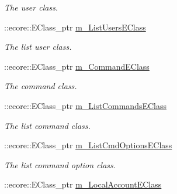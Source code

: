 \begin{DoxyCompactItemize}
\begin{DoxyCompactList}\small\item\em The user class. \item\end{DoxyCompactList}\item 
\hypertarget{classUMS__Data_1_1UMS__DataPackage_a834ee2eaa12c74455b4beeea53b6401f}{
::ecore::EClass\_\-ptr \hyperlink{classUMS__Data_1_1UMS__DataPackage_a834ee2eaa12c74455b4beeea53b6401f}{m\_\-ListUsersEClass}}
\label{classUMS__Data_1_1UMS__DataPackage_a834ee2eaa12c74455b4beeea53b6401f}

\begin{DoxyCompactList}\small\item\em The list user class. \item\end{DoxyCompactList}\item 
\hypertarget{classUMS__Data_1_1UMS__DataPackage_a036940811b726631a2424a1aa2d59a05}{
::ecore::EClass\_\-ptr \hyperlink{classUMS__Data_1_1UMS__DataPackage_a036940811b726631a2424a1aa2d59a05}{m\_\-CommandEClass}}
\label{classUMS__Data_1_1UMS__DataPackage_a036940811b726631a2424a1aa2d59a05}

\begin{DoxyCompactList}\small\item\em The command class. \item\end{DoxyCompactList}\item 
\hypertarget{classUMS__Data_1_1UMS__DataPackage_af43d19b34933b80e8b824661a49b890f}{
::ecore::EClass\_\-ptr \hyperlink{classUMS__Data_1_1UMS__DataPackage_af43d19b34933b80e8b824661a49b890f}{m\_\-ListCommandsEClass}}
\label{classUMS__Data_1_1UMS__DataPackage_af43d19b34933b80e8b824661a49b890f}

\begin{DoxyCompactList}\small\item\em The list command class. \item\end{DoxyCompactList}\item 
\hypertarget{classUMS__Data_1_1UMS__DataPackage_a2b5c49c29c382bb2f41c1665ab67ad58}{
::ecore::EClass\_\-ptr \hyperlink{classUMS__Data_1_1UMS__DataPackage_a2b5c49c29c382bb2f41c1665ab67ad58}{m\_\-ListCmdOptionsEClass}}
\label{classUMS__Data_1_1UMS__DataPackage_a2b5c49c29c382bb2f41c1665ab67ad58}

\begin{DoxyCompactList}\small\item\em The list command option class. \item\end{DoxyCompactList}\item 
\hypertarget{classUMS__Data_1_1UMS__DataPackage_a35eda48256709b6519dc338d694927c7}{
::ecore::EClass\_\-ptr \hyperlink{classUMS__Data_1_1UMS__DataPackage_a35eda48256709b6519dc338d694927c7}{m\_\-LocalAccountEClass}}
\label{classUMS__Data_1_1UMS__DataPackage_a35eda48256709b6519dc338d694927c7}


\end{DoxyCompactItemize}

